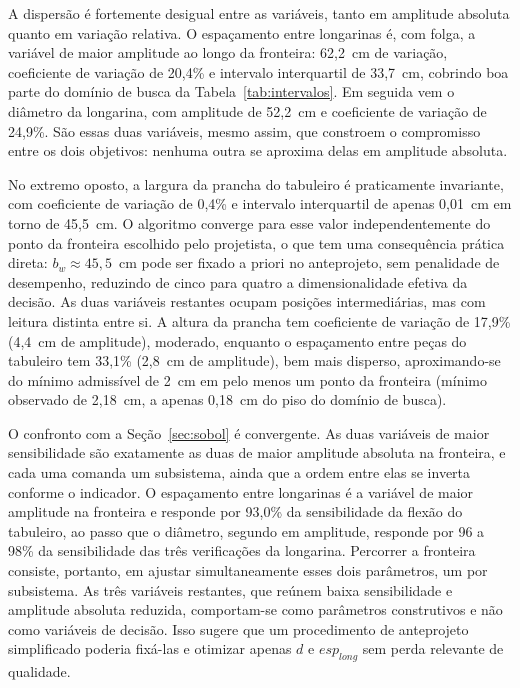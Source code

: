 A dispersão é fortemente desigual entre as variáveis, tanto em amplitude absoluta quanto em variação relativa.
O espaçamento entre longarinas é, com folga, a variável de maior amplitude ao longo da fronteira: 62{,}2~cm de variação, coeficiente de variação de 20{,}4\% e intervalo interquartil de 33{,}7~cm, cobrindo boa parte do domínio de busca da Tabela~\ref{tab:intervalos}.
Em seguida vem o diâmetro da longarina, com amplitude de 52{,}2~cm e coeficiente de variação de 24{,}9\%.
São essas duas variáveis, mesmo assim, que constroem o compromisso entre os dois objetivos: nenhuma outra se aproxima delas em amplitude absoluta.

No extremo oposto, a largura da prancha do tabuleiro é praticamente invariante, com coeficiente de variação de 0{,}4\% e intervalo interquartil de apenas 0{,}01~cm em torno de 45{,}5~cm.
O algoritmo converge para esse valor independentemente do ponto da fronteira escolhido pelo projetista, o que tem uma consequência prática direta: $b_w \approx 45{,}5$~cm pode ser fixado a priori no anteprojeto, sem penalidade de desempenho, reduzindo de cinco para quatro a dimensionalidade efetiva da decisão.
As duas variáveis restantes ocupam posições intermediárias, mas com leitura distinta entre si. A altura da prancha tem coeficiente de variação de 17{,}9\% (4{,}4~cm de amplitude), moderado, enquanto o espaçamento entre peças do tabuleiro tem 33{,}1\% (2{,}8~cm de amplitude), bem mais disperso, aproximando-se do mínimo admissível de 2~cm em pelo menos um ponto da fronteira (mínimo observado de 2{,}18~cm, a apenas 0{,}18~cm do piso do domínio de busca).

O confronto com a Seção~\ref{sec:sobol} é convergente.
As duas variáveis de maior sensibilidade são exatamente as duas de maior amplitude absoluta na fronteira, e cada uma comanda um subsistema, ainda que a ordem entre elas se inverta conforme o indicador. O espaçamento entre longarinas é a variável de maior amplitude na fronteira e responde por 93{,}0\% da sensibilidade da flexão do tabuleiro, ao passo que o diâmetro, segundo em amplitude, responde por 96 a 98\% da sensibilidade das três verificações da longarina.
Percorrer a fronteira consiste, portanto, em ajustar simultaneamente esses dois parâmetros, um por subsistema.
As três variáveis restantes, que reúnem baixa sensibilidade e amplitude absoluta reduzida, comportam-se como parâmetros construtivos e não como variáveis de decisão. Isso sugere que um procedimento de anteprojeto simplificado poderia fixá-las e otimizar apenas $d$ e $esp_{long}$ sem perda relevante de qualidade.

